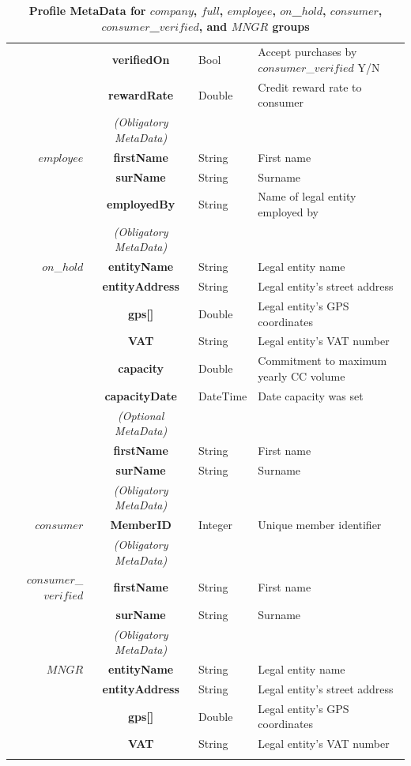 \begin{table}[H]
\begin{centering}
{\begin{tabular}{ r | c | l | l }
			& {\bf verifiedOn}			&Bool	& Accept purchases by $consumer$\_$verified$ Y/N \\
			& {\bf rewardRate}			&Double	& Credit reward rate to consumer \\
\Xhline{1.5pt}
			& \emph{(Obligatory MetaData)} & & \\
\cline{2-2}
$employee$	& {\bf firstName}			&String	& First name \\
			& {\bf surName}			&String	& Surname \\
			& {\bf employedBy}			&String	& Name of legal entity employed by \\
\Xhline{1.5pt}
			& \emph{(Obligatory MetaData)} & & \\
\cline{2-2}
$on$\_$hold$	& {\bf entityName}			&String	& Legal entity name \\
			& {\bf entityAddress}			&String	& Legal entity's street address \\
			& {\bf gps[]}				&Double	& Legal entity's GPS coordinates \\
			& {\bf VAT}				&String	& Legal entity's VAT number \\
			& {\bf capacity}				&Double	& Commitment to maximum yearly CC volume \\
			& {\bf capacityDate}			&DateTime & Date capacity was set \\
\cline{2-2}
			 & \emph{(Optional MetaData)}& & \\
\cline{2-2}
			& {\bf firstName}			&String	& First name \\
			& {\bf surName}			&String	& Surname \\
\Xhline{1.5pt}
			& \emph{(Obligatory MetaData)} & & \\
\cline{2-2}
$consumer$	& {\bf MemberID}	&Integer & Unique member identifier \\
\Xhline{1.5pt}
			& \emph{(Obligatory MetaData)} & & \\
\cline{2-2}
$consumer$\_$verified$ & {\bf firstName}			&String	& First name \\
			& {\bf surName}			&String	& Surname \\
\Xhline{1.5pt}
			& \emph{(Obligatory MetaData)} & & \\
\cline{2-2}
$MNGR$ 		& {\bf entityName}			&String	& Legal entity name \\
			& {\bf entityAddress}			&String	& Legal entity's street address \\
			& {\bf gps[]}				&Double	& Legal entity's GPS coordinates \\
			& {\bf VAT}				&String	& Legal entity's VAT number \\
\Xhline{1.5pt}
\end{tabular}
}
\caption{\small\textbf{Profile MetaData for $company$, $full$, $employee$, $on$\_$hold$, $consumer$, $consumer$\_$verified$, and $MNGR$ groups}}
\label{tab:ProfileMetaData2}
\end{centering}
\end{table}


